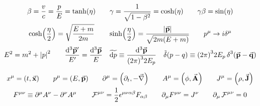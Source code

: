 \begin{gather*}
        \beta
        = \frac{v}{c}
        = \frac{p}{E}
        = \tanh(\eta)
        \qquad
        \gamma
        = \frac{1}{\sqrt{1-\beta^2}}
        = \cosh(\eta)
        \qquad
        \gamma\beta = \sin(\eta)
        \\
        \cosh(\frac{\eta}{2}) = \sqrt{\frac{E+m}{2m}}
        \qquad
        \sinh(\frac{\eta}{2}) = \frac{\abs{\va{p}}}{\sqrt{2m\qty(E+m)}}
        \qquad
        p^\mu \to i \delta^\mu
        \\
        E^2 = m^2 + \abs{p}^2
        \qquad
        \frac{\dd[3]{\va{p}'}}{E'} = \frac{\dd[3]{\va{p}}}{E}
        \quad
        \widetilde{\dd{p}} \equiv \frac{\dd[3]{\va{p}}}{\qty(2\pi)^32E_p}
        \quad
        \tilde{\delta}\qty(p-q) \equiv \qty(2\pi)^32E_p\Ddelta[3](\va{p}-\va{q})
\end{gather*}

\begin{gather*}
        x^{\mu} = (t, \va{x})
        \qquad
        p^{\mu} = (E, \va{p})
        \qquad
        \partial^{\mu} = \qty(\partial_t, -\va{\nabla})
        \qquad
        A^{\mu} = \qty(\phi, \va{A})
        \qquad
        J^{\mu} = \qty(\rho, \va{J})
        \\
        F^{\mu\nu} \equiv \partial^\mu A^\nu - \partial^\nu A^\mu
        \qquad
        \operatorname{\mathcal{F}}^{\mu\nu} = \frac{1}{2}\epsilon^{\mu\nu\alpha\beta}F_{\alpha\beta}
        \qquad
        \partial_\mu F^{\mu\nu} = J^{\nu}
        \qquad
        \partial_\mu \operatorname{\mathcal{F}}^{\mu\nu} = 0
\end{gather*}

